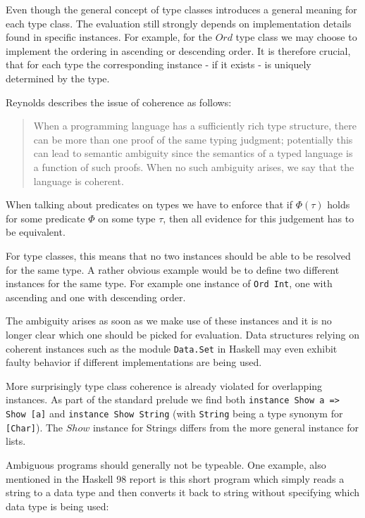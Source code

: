 Even though the general concept of type classes introduces a general meaning for each type class.
The evaluation still strongly depends on implementation details found in specific instances.
For example, for the $\mathit{Ord}$ type class we may choose to implement the ordering in ascending or descending order.
It is therefore crucial, that for each type the corresponding instance - if it exists - is uniquely determined by the type.

Reynolds \cite{reynolds_coherence} describes the issue of coherence as follows:

\begin{quote}
    When a programming language has a sufficiently rich type structure, there can be more than one proof of the same
    typing judgment; potentially this can lead to semantic ambiguity since the semantics of a typed language is a function
    of such proofs. When no such ambiguity arises, we say that the language is coherent.
\end{quote}

When talking about predicates on types we have to enforce that if $\Phi(\tau)$ holds for some predicate $\Phi$ on some type $\tau$,
then all evidence for this judgement has to be equivalent.

For type classes, this means that no two instances should be able to be resolved for the same type.
A rather obvious example would be to define two different instances for the same type.
For example one instance of \texttt{Ord Int}, one with ascending and one with descending order.

The ambiguity arises as soon as we make use of these instances and it is no longer clear which one should be picked for evaluation.
Data structures relying on coherent instances such as the module \texttt{Data.Set} in Haskell may even exhibit faulty behavior if different implementations are being used. \cite{Kilpatrick2019-cy}

More surprisingly type class coherence is already violated for overlapping instances.
As part of the standard prelude we find both \texttt{instance Show a => Show [a]} and \texttt{instance Show String}
(with \texttt{String} being a type synonym for \texttt{[Char]}).
The $\mathit{Show}$ instance for Strings differs from the more general instance for lists.

Ambiguous programs should generally not be typeable.
One example, also mentioned in the Haskell 98 report \cite{Haskell98} is this short program which simply reads a string to a data type and then converts it back to string without specifying which data type is being used:

